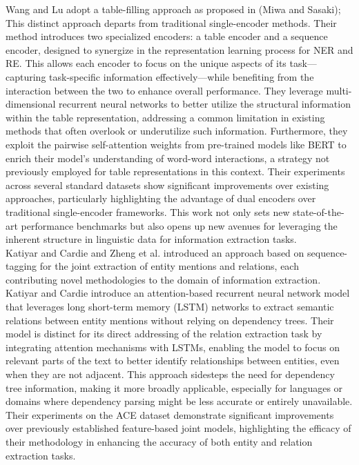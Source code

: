 Wang and Lu\cite{wang-lu-2020-two} adopt a table-filling approach as proposed in (Miwa and Sasaki\cite{miwa-sasaki-2014-modeling});
This distinct approach departs from traditional single-encoder methods. Their method introduces two specialized encoders: a table encoder and a sequence encoder, designed to synergize in the representation learning process for NER and RE. This allows each encoder to focus on the unique aspects of its task—capturing task-specific information effectively—while benefiting from the interaction between the two to enhance overall performance. They leverage multi-dimensional recurrent neural networks to better utilize the structural information within the table representation, addressing a common limitation in existing methods that often overlook or underutilize such information. Furthermore, they exploit the pairwise self-attention weights from pre-trained models like BERT\cite{devlin2019bert} to enrich their model's understanding of word-word interactions, a strategy not previously employed for table representations in this context. Their experiments across several standard datasets show significant improvements over existing approaches, particularly highlighting the advantage of dual encoders over traditional single-encoder frameworks. This work not only sets new state-of-the-art performance benchmarks but also opens up new avenues for leveraging the inherent structure in linguistic data for information extraction tasks.\\

Katiyar and Cardie\cite{katiyar-cardie-2017-going} and Zheng et al.\cite{zheng-etal-2017-joint} introduced an approach based on sequence-tagging for the joint extraction of entity mentions and relations, each contributing novel methodologies to the domain of information extraction. Katiyar and Cardie introduce an attention-based recurrent neural network model that leverages long short-term memory (LSTM) networks to extract semantic relations between entity mentions without relying on dependency trees. Their model is distinct for its direct addressing of the relation extraction task by integrating attention mechanisms with LSTMs, enabling the model to focus on relevant parts of the text to better identify relationships between entities, even when they are not adjacent. This approach sidesteps the need for dependency tree information, making it more broadly applicable, especially for languages or domains where dependency parsing might be less accurate or entirely unavailable. Their experiments on the ACE dataset demonstrate significant improvements over previously established feature-based joint models, highlighting the efficacy of their methodology in enhancing the accuracy of both entity and relation extraction tasks.

